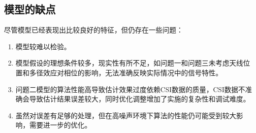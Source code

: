 \documentclass[withoutpreface,bwprint]{cumcmthesis}
\begin{document}
\subsection{模型的缺点}
尽管模型已经表现出比较良好的特征，但仍存在一些问题：

\begin{enumerate}
    \item 模型较难以检验。
    \item 模型假设的理想条件较多，现实性有所不足，如问题一和问题三未考虑天线位置和多径效应对相位的影响，无法准确反映实际情况中的信号特性。
    \item 问题二模型的算法性能高导致估计效果过度依赖CSI数据的质量，CSI数据不准确会导致估计结果误差较大，同时优化调整增加了实施的复杂性和调试难度。
    \item 虽然对误差有足够的处理，但在高噪声环境下算法的性能仍可能受到较大影响，需要进一步的优化。
\end{enumerate}
\end{document}
